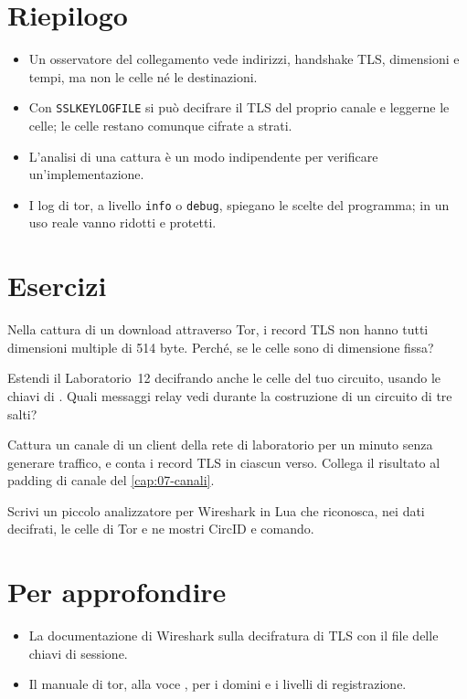 \section*{Riepilogo}
\begin{itemize}
  \item Un osservatore del collegamento vede indirizzi, handshake TLS, dimensioni e tempi, ma non le celle né le destinazioni.
  \item Con \texttt{SSLKEYLOGFILE} si può decifrare il TLS del proprio canale e leggerne le celle; le celle  restano comunque cifrate a strati.
  \item L'analisi di una cattura è un modo indipendente per verificare un'implementazione.
  \item I log di tor, a livello \texttt{info} o \texttt{debug}, spiegano le scelte del programma; in un uso reale vanno ridotti e protetti.
\end{itemize}

\section*{Esercizi}

\begin{esercizio}[1]\label{es:20-dimensioni}
Nella cattura di un download attraverso Tor, i record TLS non hanno tutti dimensioni multiple di 514 byte. Perché, se le celle sono di dimensione fissa?
\end{esercizio}

\begin{esercizio}[2]\label{es:20-relay}
Estendi il Laboratorio~12 decifrando anche le celle  del tuo circuito, usando le chiavi di . Quali messaggi relay vedi durante la costruzione di un circuito di tre salti?
\end{esercizio}

\begin{esercizio}[2]\label{es:20-padding}
Cattura un canale di un client della rete di laboratorio per un minuto senza generare traffico, e conta i record TLS in ciascun verso. Collega il risultato al padding di canale del \cref{cap:07-canali}.
\end{esercizio}

\begin{esercizio}[3]\label{es:20-dissector}
Scrivi un piccolo analizzatore per Wireshark in Lua che riconosca, nei dati decifrati, le celle di Tor e ne mostri CircID e comando.
\end{esercizio}

\section*{Per approfondire}
\begin{itemize}
  \item La documentazione di Wireshark sulla decifratura di TLS con il file delle chiavi di sessione.
  \item Il manuale di tor, alla voce , per i domini e i livelli di registrazione.
\end{itemize}
